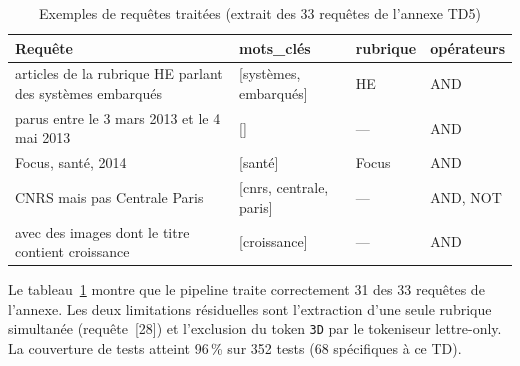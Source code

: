\begin{table}[ht]
\centering
\caption{Exemples de requêtes traitées (extrait des 33 requêtes de l'annexe TD5)}
\label{tab:td5_examples}
\begin{tabular}{>{\small}p{5.8cm} >{\small}p{2.8cm} >{\small}p{2cm} >{\small}p{1.8cm}}
\toprule
\textbf{Requête} & \textbf{mots\_clés} & \textbf{rubrique} & \textbf{opérateurs} \\
\midrule
articles de la rubrique HE parlant des systèmes embarqués
  & [systèmes, embarqués] & HE & AND \\
parus entre le 3 mars 2013 et le 4 mai 2013
  & [] & — & AND \\
Focus, santé, 2014
  & [santé] & Focus & AND \\
CNRS mais pas Centrale Paris
  & [cnrs, centrale, paris] & — & AND, NOT \\
avec des images dont le titre contient croissance
  & [croissance] & — & AND \\
\bottomrule
\end{tabular}
\end{table}

Le tableau~\ref{tab:td5_examples} montre que le pipeline traite correctement 31 des
33 requêtes de l'annexe. Les deux limitations résiduelles sont l'extraction d'une seule
rubrique simultanée (requête~[28]) et l'exclusion du token \texttt{3D} par le tokeniseur
lettre-only. La couverture de tests atteint 96\,\% sur 352 tests (68 spécifiques à ce TD).
